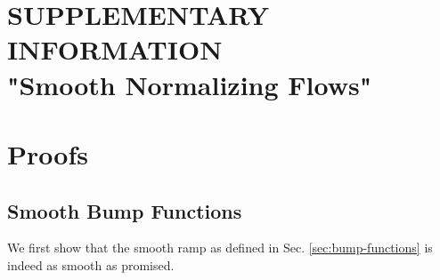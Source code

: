 \documentclass{article}
\newcommand{\TODO}[1]{{\color{orange} \textbf{TODO:} #1 }}
\begin{document}

\setcounter{section}{0}
\setcounter{table}{0}
\setcounter{figure}{0}
\renewcommand\thesection{SI-\arabic{section}}
\renewcommand\thetable{SI-\arabic{table}}
\renewcommand\thefigure{SI-\arabic{figure}}

\newpage
\section*{SUPPLEMENTARY INFORMATION\\ "Smooth Normalizing Flows"}
\section{Proofs}
\subsection{Smooth Bump Functions}

We first show that the smooth ramp as defined in Sec. \ref{sec:bump-functions} is indeed as smooth as promised. 
\end{document}
